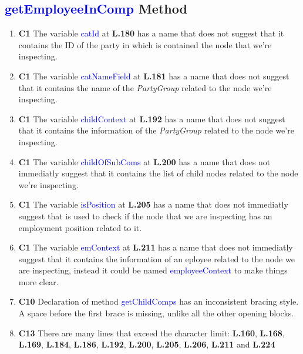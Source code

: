 \subsection{\textcolor{blue}{getEmployeeInComp} Method}

\begin{enumerate}

  \item \textbf{C1} The variable \textcolor{blue}{catId} at \textbf{L.180} has a
    name that does not suggest that it contains the ID of the party in which is
    contained the node that we're inspecting.

  \item \textbf{C1} The variable \textcolor{blue}{catNameField} at
    \textbf{L.181} has a name that does not suggest that it contains the
    name of the \textit{PartyGroup} related to the node we're inspecting.

  \item \textbf{C1} The variable \textcolor{blue}{childContext} at
    \textbf{L.192} has a name that does not suggest that it contains the
    information of the \textit{PartyGroup} related to the node we're inspecting.

  \item \textbf{C1} The variable \textcolor{blue}{childOfSubComs} at
    \textbf{L.200} has a name that does not immediatly suggest that it contains
    the list of child nodes related to the node we're inspecting.

  \item \textbf{C1} The variable \textcolor{blue}{isPosition} at
    \textbf{L.205} has a name that does not immediatly suggest that is used to
    check if the node that we are inspecting has an employment position related
    to it.

  \item \textbf{C1} The variable \textcolor{blue}{emContext} at
    \textbf{L.211} has a name that does not immediatly suggest that it contains
    the information of an eployee related to the node we are inspecting, instead
    it could be named \textcolor{blue}{employeeContext} to make things more
    clear.

  \item \textbf{C10} Declaration of method \textcolor{blue}{getChildComps} has
    an inconsistent bracing style. A space before the first brace is missing,
    unlike all the other opening blocks.

  \item \textbf{C13} There are many lines that exceed the
    character limit: \textbf{L.160}, \textbf{L.168}, \textbf{L.169},
    \textbf{L.184}, \textbf{L.186}, \textbf{L.192}, \textbf{L.200},
    \textbf{L.205}, \textbf{L.206}, \textbf{L.211} and \textbf{L.224}


\end{enumerate}
